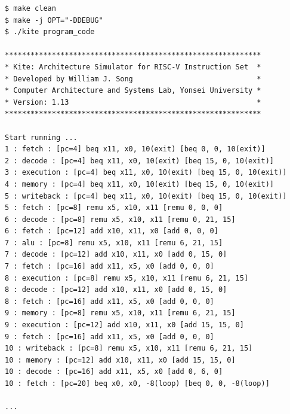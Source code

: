 \documentclass[10pt]{article}
\begin{document}
\begin{Verbatim}[frame=single,fontsize=\small]
$ make clean
$ make -j OPT="-DDEBUG" 
$ ./kite program_code

************************************************************
* Kite: Architecture Simulator for RISC-V Instruction Set  *
* Developed by William J. Song                             *
* Computer Architecture and Systems Lab, Yonsei University *
* Version: 1.13                                            *
************************************************************

Start running ...
1 : fetch : [pc=4] beq x11, x0, 10(exit) [beq 0, 0, 10(exit)]
2 : decode : [pc=4] beq x11, x0, 10(exit) [beq 15, 0, 10(exit)]
3 : execution : [pc=4] beq x11, x0, 10(exit) [beq 15, 0, 10(exit)]
4 : memory : [pc=4] beq x11, x0, 10(exit) [beq 15, 0, 10(exit)]
5 : writeback : [pc=4] beq x11, x0, 10(exit) [beq 15, 0, 10(exit)]
5 : fetch : [pc=8] remu x5, x10, x11 [remu 0, 0, 0]
6 : decode : [pc=8] remu x5, x10, x11 [remu 0, 21, 15]
6 : fetch : [pc=12] add x10, x11, x0 [add 0, 0, 0]
7 : alu : [pc=8] remu x5, x10, x11 [remu 6, 21, 15]
7 : decode : [pc=12] add x10, x11, x0 [add 0, 15, 0]
7 : fetch : [pc=16] add x11, x5, x0 [add 0, 0, 0]
8 : execution : [pc=8] remu x5, x10, x11 [remu 6, 21, 15]
8 : decode : [pc=12] add x10, x11, x0 [add 0, 15, 0]
8 : fetch : [pc=16] add x11, x5, x0 [add 0, 0, 0]
9 : memory : [pc=8] remu x5, x10, x11 [remu 6, 21, 15]
9 : execution : [pc=12] add x10, x11, x0 [add 15, 15, 0]
9 : fetch : [pc=16] add x11, x5, x0 [add 0, 0, 0]
10 : writeback : [pc=8] remu x5, x10, x11 [remu 6, 21, 15]
10 : memory : [pc=12] add x10, x11, x0 [add 15, 15, 0]
10 : decode : [pc=16] add x11, x5, x0 [add 0, 6, 0]
10 : fetch : [pc=20] beq x0, x0, -8(loop) [beq 0, 0, -8(loop)]

...
\end{Verbatim}
\end{document}
